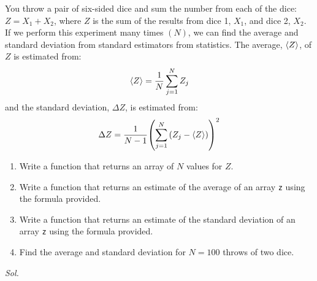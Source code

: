     \begin{problem}\label{problem_2.10}
        You throw a pair of six-sided dice and sum the number from each of the dice: $ Z = X_1 + X_2 $, where $Z$ is the sum of the results from dice 1, $ X_1 $, and dice 2, $ X_2 $. If we perform this experiment many times $(N)$, we can find the average and standard deviation from standard estimators from statistics. The average, $\expval{Z}$, of $Z$ is estimated from:
        \begin{equation} \label{eqt: 2_10_1}
            \expval{Z} = \frac{1}{N} \sum_{j=1}^{N} Z_j
        \end{equation} 
        and the standard deviation, $\Delta Z$, is estimated from:
        \begin{equation}\label{eqt: 2_10_2}
            \Delta Z =\frac{1}{N-1} \qty(\sum_{j=1}^{N} \qty(Z_j - \expval{Z}))^{2}
        \end{equation}
        \begin{enumerate}
            \item Write a function that returns an array of $N$ values for $Z$.
            \item Write a function that returns an estimate of the average of an array \verb|z| using the formula provided.
            \item Write a function that returns an estimate of the standard deviation of an array \verb|z| using the formula provided.
            \item Find the average and standard deviation for $N=100$ throws of two dice. 
        \end{enumerate}
    \end{problem}
    \textit{ Sol. }
    


